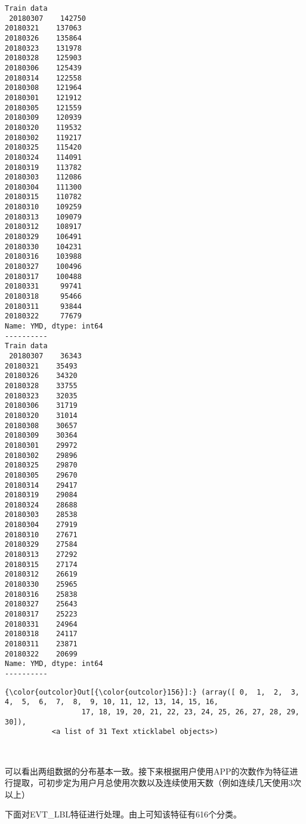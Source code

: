 \documentclass[11pt]{article}
\begin{document}
    \begin{Verbatim}[commandchars=\\\{\}]
Train data
 20180307    142750
20180321    137063
20180326    135864
20180323    131978
20180328    125903
20180306    125439
20180314    122558
20180308    121964
20180301    121912
20180305    121559
20180309    120939
20180320    119532
20180302    119217
20180325    115420
20180324    114091
20180319    113782
20180303    112086
20180304    111300
20180315    110782
20180310    109259
20180313    109079
20180312    108917
20180329    106491
20180330    104231
20180316    103988
20180327    100496
20180317    100488
20180331     99741
20180318     95466
20180311     93844
20180322     77679
Name: YMD, dtype: int64
----------
Train data
 20180307    36343
20180321    35493
20180326    34320
20180328    33755
20180323    32035
20180306    31719
20180320    31014
20180308    30657
20180309    30364
20180301    29972
20180302    29896
20180325    29870
20180305    29670
20180314    29417
20180319    29084
20180324    28688
20180303    28538
20180304    27919
20180310    27671
20180329    27584
20180313    27292
20180315    27174
20180312    26619
20180330    25965
20180316    25838
20180327    25643
20180317    25223
20180331    24964
20180318    24117
20180311    23871
20180322    20699
Name: YMD, dtype: int64
----------

    \end{Verbatim}

\begin{Verbatim}[commandchars=\\\{\}]
{\color{outcolor}Out[{\color{outcolor}156}]:} (array([ 0,  1,  2,  3,  4,  5,  6,  7,  8,  9, 10, 11, 12, 13, 14, 15, 16,
                  17, 18, 19, 20, 21, 22, 23, 24, 25, 26, 27, 28, 29, 30]),
           <a list of 31 Text xticklabel objects>)
\end{Verbatim}
            
    \begin{center}
    \end{center}
    { \hspace*{\fill} \\}
    
    可以看出两组数据的分布基本一致。接下来根据用户使用APP的次数作为特征进行提取，可初步定为用户月总使用次数以及连续使用天数（例如连续几天使用3次以上）

    下面对EVT\_LBL特征进行处理。由上可知该特征有616个分类。
\end{document}
